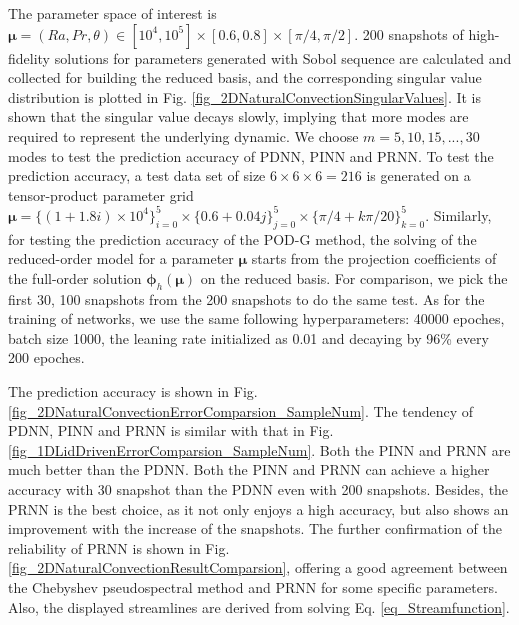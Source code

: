 \documentclass[preprint, 10pt]{elsarticle}
\begin{document}
The parameter space of interest is $\pmb{\mu}=(Ra, Pr, \theta) \in [10^4, 10^5] \times [0.6, 0.8] \times[\pi/4, \pi/2]$. 200 snapshots of high-fidelity solutions for parameters generated with Sobol sequence are calculated and collected for building the reduced basis, and the corresponding singular value distribution is plotted in Fig. \ref{fig_2DNaturalConvectionSingularValues}. It is shown that the singular value decays slowly, implying that more modes are required to represent the underlying dynamic. We choose $m=5, 10, 15,...,30$ modes to test the prediction accuracy of PDNN, PINN and PRNN.
To test the prediction accuracy, a test data set of size $6 \times 6 \times 6=216$ is generated on a tensor-product parameter grid $\pmb{\mu}=\{(1+ 1.8i)\times 10^4\}_{i=0}^{5} \times \{0.6+ 0.04j\}_{j=0}^{5} \times \{\pi/4+ k\pi/20\}_{k=0}^{5}$.
Similarly, for testing the prediction accuracy of the POD-G method, the solving of the reduced-order model for a parameter $\pmb{\mu}$ starts from the projection coefficients of the full-order solution $\pmb{\phi}_h \left( \pmb{\mu} \right)$ on the reduced basis.
For comparison, we pick the first 30, 100 snapshots from the 200 snapshots to do the same test. As for the training of networks, we use the same following hyperparameters: 40000 epoches, batch size 1000, the leaning rate initialized as 0.01 and decaying by 96\% every 200 epoches.

The prediction accuracy is shown in Fig. \ref{fig_2DNaturalConvectionErrorComparsion_SampleNum}. The tendency of PDNN, PINN and PRNN is similar with that in Fig. \ref{fig_1DLidDrivenErrorComparsion_SampleNum}. Both the PINN and PRNN are much better than the PDNN.  Both the PINN and PRNN can achieve a higher accuracy with 30 snapshot than the PDNN even with 200 snapshots. Besides, the PRNN is the best choice, as it not only enjoys a high accuracy, but also shows an improvement with the increase of the snapshots. The further confirmation of the reliability of PRNN is shown in Fig. \ref{fig_2DNaturalConvectionResultComparsion}, offering a good agreement between the Chebyshev pseudospectral method and PRNN for some specific parameters. Also, the displayed streamlines are derived from solving Eq. \ref{eq_Streamfunction}.
\end{document}
